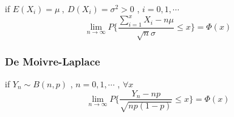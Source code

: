 \documentclass{ctexart}
\begin{document}
if \(E(X_i)=\mu\ , \ D(X_i)=\sigma^2>0\) , \(i=0,1,\cdots\)
\[\lim_{n\to \infty}P\{\frac{\sum_{i=1}^{x}X_i-n\mu}{\sqrt{n}\sigma}\leq x\}=\Phi(x) \]

\subsubsection{De Moivre-Laplace}
if \(Y_n\sim B(n,p)\) , \(n=0,1,\cdots\) , \(\forall x\)
\[\lim_{n\to \infty}P\{\frac{Y_n-np}{\sqrt{np(1-p)}}\leq x\}=\Phi(x)\]
\end{document}
